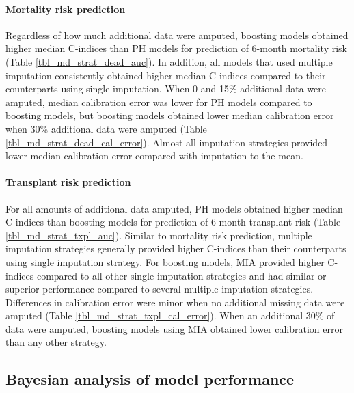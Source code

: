 \documentclass{article}
\begin{document}
\paragraph{Mortality risk prediction}

Regardless of how much additional data were amputed, boosting models
obtained higher median C-indices than PH models for prediction of
6-month mortality risk (Table \ref{tbl_md_strat_dead_auc}). In addition,
all models that used multiple imputation consistently obtained higher
median C-indices compared to their counterparts using single imputation.
When 0 and 15\% additional data were amputed, median calibration error
was lower for PH models compared to boosting models, but boosting models
obtained lower median calibration error when 30\% additional data were
amputed (Table \ref{tbl_md_strat_dead_cal_error}). Almost all imputation
strategies provided lower median calibration error compared with
imputation to the mean.

\paragraph{Transplant risk prediction}

For all amounts of additional data amputed, PH models obtained higher
median C-indices than boosting models for prediction of 6-month
transplant risk (Table \ref{tbl_md_strat_txpl_auc}). Similar to
mortality risk prediction, multiple imputation strategies generally
provided higher C-indices than their counterparts using single
imputation strategy. For boosting models, MIA provided higher C-indices
compared to all other single imputation strategies and had similar or
superior performance compared to several multiple imputation strategies.
Differences in calibration error were minor when no additional missing
data were amputed (Table \ref{tbl_md_strat_txpl_cal_error}). When an
additional 30\% of data were amputed, boosting models using MIA obtained
lower calibration error than any other strategy.

\hypertarget{bayesian-analysis-of-model-performance}{%
\subsection{Bayesian analysis of model
performance}\label{bayesian-analysis-of-model-performance}}
\end{document}
